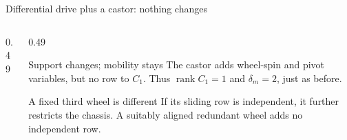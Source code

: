 \documentclass[aspectratio=169]{beamer}
\begin{document}
\begin{frame}[t]{Differential drive plus a castor: nothing changes}
\small
\setlength{\abovedisplayskip}{1mm}\setlength{\belowdisplayskip}{1mm}
\setlength{\abovedisplayshortskip}{0pt}\setlength{\belowdisplayshortskip}{0pt}
\begin{columns}[T,onlytextwidth]\begin{column}{0.49\textwidth}
\centering{}\end{column}\begin{column}{0.49\textwidth}
\begin{block}{Support changes; mobility stays}
The castor adds wheel-spin and pivot variables, but no row to $C_1$. Thus $\operatorname{rank}C_1=1$ and $\delta_m=2$, just as before.
\end{block}\vspace{2mm}
\begin{block}{A fixed third wheel is different}
If its sliding row is independent, it further restricts the chassis. A suitably aligned redundant wheel adds no independent row.
\end{block}\vspace{2mm}
\end{column}\end{columns}
\end{frame}
\end{document}
